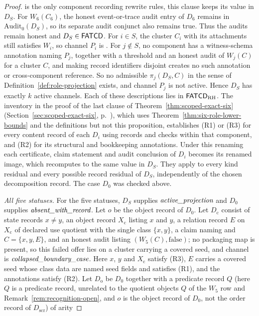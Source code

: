\begin{proof}
is the only component recording rewrite rules, this clause keeps its value in
\(D_S\). For
\(W_6(C_6)\), the honest event-or-trace audit entry of \(D_6\) remains in
\(\mathrm{Audit}_0(D_S)\), so its separate audit conjunct also remains true.
Thus the audits remain honest and \(D_S\in\mathsf{FATCD}{}\). For \(i\in S\), the cluster \(C_i\)
with its attachments still satisfies \(W_i\), so channel \(P_i\) is
\activeproj{}. For \(j\notin S\), no component has a witness-schema
annotation naming \(P_j\), together with a threshold and an honest audit of
\(W_j(C)\) for a cluster \(C\), and making record identifiers disjoint creates
no such annotation or cross-component reference. So no admissible
\(\pi_j(D_S,C)\) in the sense of Definition~\ref{def:role-projection} exists,
and channel \(P_j\) is not active. Hence \(D_S\) has exactly \(k\) active
channels.
Each of these descriptions lies in \(\mathsf{FATCD}_{\mathrm{RH}}\).
The inventory in the proof of the last clause of
Theorem~\ref{thm:scoped-exact-six} (Section~\ref{sec:scoped-exact-six}, p.~\pageref{thm:scoped-exact-six}), which uses
Theorem~\ref{thm:six-role-lower-bounds} and the definitions but not this
proposition, establishes (R1) or (R3) for every content record of each \(D_i\)
using records and checks within that component, and (R2) for its
structural and bookkeeping annotations. Under this renaming each
certificate, claim statement and audit conclusion of \(D_i\) becomes its renamed
image, which recomputes to the same value in \(D_S\). They apply to every
kind residual and every possible record residual of \(D_S\),
independently of the chosen decomposition record. The case \(D_0\)
was checked above.
\par\emph{All five statuses.} For the five statuses, \(D_S\) supplies \(\textit{active\_\allowbreak projection}\) and \(D_0\) supplies
\(\textit{absent\_\allowbreak with\_\allowbreak record}\). Let \(o\) be the object record of \(D_0\). Let \(D_{\mathrm c}\) consist of state
records \(x\ne y\), an object record \(X_{\mathrm c}\) listing \(x\) and \(y\), a
relation record \(E\) on \(X_{\mathrm c}\) of declared use quotient with the
single class \(\{x,y\}\), a claim naming \Pfive{} and \(C=\{x,y,E\}\), and an
honest audit listing \((W_5(C),\mathrm{false})\); no packaging map is present, so
this failed offer lies on a cluster carrying a covered \Pfive{} seed, and channel
\Pfive{} is \(\textit{collapsed\_\allowbreak boundary\_\allowbreak case}\). Here \(x\), \(y\) and \(X_{\mathrm c}\) satisfy (R3), \(E\) carries a
covered seed whose class data are named seed fields and satisfies (R1), and the
annotations satisfy (R2). Let \(D_{\mathrm{o}}\) be \(D_0\) together with a predicate record \(Q\) (here \(Q\) is a predicate record, unrelated to the quotient objects \(Q\) of the \(W_5\) row and Remark~\ref{rem:recognition-open}, and \(o\) is the object record of \(D_0\), not the order record of \(D_{\mathrm{scr}}\)) of arity

\end{proof}
